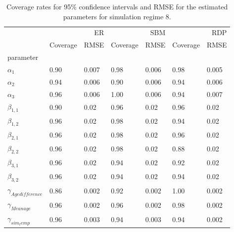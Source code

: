 \begin{table}[ht]
\centering
\caption{Coverage rates for 95\% confidence intervals and RMSE for the estimated parameters for simulation regime 8.}
\label{tab:regime_8_params}
\begin{tabular}{lllllll}
\toprule
 & \multicolumn{2}{r}{ER} & \multicolumn{2}{r}{SBM} & \multicolumn{2}{r}{RDP} \\
 & Coverage & RMSE & Coverage & RMSE & Coverage & RMSE \\
parameter &  &  &  &  &  &  \\
\midrule
$\alpha_{1}$ & 0.90 & 0.007 & 0.98 & 0.006 & 0.98 & 0.005 \\
$\alpha_{2}$ & 0.94 & 0.006 & 0.90 & 0.006 & 0.94 & 0.006 \\
$\alpha_{3}$ & 0.96 & 0.006 & 1.00 & 0.006 & 0.94 & 0.007 \\
$\beta_{1,1}$ & 0.90 & 0.02 & 0.96 & 0.02 & 0.96 & 0.02 \\
$\beta_{1,2}$ & 0.96 & 0.02 & 0.98 & 0.02 & 0.94 & 0.02 \\
$\beta_{2,1}$ & 0.96 & 0.02 & 0.98 & 0.02 & 0.96 & 0.02 \\
$\beta_{2,2}$ & 0.96 & 0.02 & 0.98 & 0.02 & 0.88 & 0.02 \\
$\beta_{3,1}$ & 0.96 & 0.02 & 0.94 & 0.02 & 0.92 & 0.02 \\
$\beta_{3,2}$ & 0.96 & 0.02 & 0.94 & 0.02 & 0.94 & 0.02 \\
$\gamma_{Age difference}$ & 0.86 & 0.002 & 0.92 & 0.002 & 1.00 & 0.002 \\
$\gamma_{Mean age}$ & 0.96 & 0.002 & 0.96 & 0.002 & 0.98 & 0.002 \\
$\gamma_{sim_temp}$ & 0.96 & 0.003 & 0.94 & 0.003 & 0.94 & 0.002 \\
\bottomrule
\end{tabular}

\end{table}
